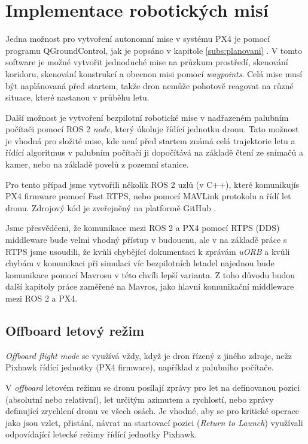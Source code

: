 \chapter{Implementace robotických misí}

Jedna možnost pro vytvoření autonomní mise v systému PX4 je pomocí programu QGroundControl, jak je popsáno v kapitole \ref{subs:planovani} . V tomto software je možné vytvořit jednoduché mise na průzkum prostředí, skenování koridoru, skenování konstrukcí a obecnou misi pomocí \textit{waypoints}. Celá mise musí být naplánovaná před startem, takže dron nemůže pohotově reagovat na různé situace, které nastanou v průběhu letu. 

Další možnost je vytvoření bezpilotní robotické mise v nadřazeném palubním počítači pomocí ROS 2 \textit{node}, který úkoluje řídící jednotku dronu. Tato možnost je vhodná pro složité mise, kde není před startem známá celá trajektorie letu a řídící algoritmus v palubním počítači ji dopočítává na základě čtení ze snímačů a kamer, nebo na základě povelů z pozemní stanice.

Pro tento případ jsme vytvořili několik ROS 2 uzlů (v C++), které komunikují\break s PX4 firmware pomocí Fast RTPS, nebo pomocí MAVLink protokolu a řídí let dronu. Zdrojový kód je zveřejněný na platformě GitHub \cite{GIT}.

Jsme přesvědčeni, že komunikace mezi ROS 2 a PX4 pomocí \acs{RTPS} (\acs{DDS}) middleware bude velmi vhodný přístup v budoucnu, ale v na základě práce s \acs{RTPS} jsme usoudili, že kvůli chybějící dokumentaci k zprávám \textit{uORB} a kvůli chybám v komunikaci při simulaci víc bezpilotních letadel najednou bude komunikace pomocí Mavrosu v této chvíli lepší varianta. Z toho důvodu budou další kapitoly práce zaměřené na Mavros, jako hlavní komunikační middleware mezi ROS 2 a PX4.

\section{Offboard letový režim}

\textit{Offboard flight mode} se využívá vždy, když je dron řízený z jiného zdroje, než\break z Pixhawk řídící jednotky (PX4 firmware), například z palubního počítače. 

V \textit{offboard} letovém režimu se dronu posílají zprávy pro let na definovanou pozici (absolutní nebo relativní), let určitým azimutem a rychlostí, nebo zprávy definující zrychlení dronu ve všech osách. Je vhodné, aby se pro kritické operace jako jsou vzlet, přistání, návrat na startovací pozici (\textit{Return to Launch}) využívali odpovídající letecké režimy řídící jednotky Pixhawk.


